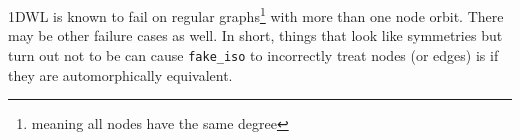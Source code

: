 \documentclass{article}
\begin{document}
1DWL is known to fail on regular graphs\footnote{meaning all nodes have the same degree} with more than one node orbit. There may be other failure cases as well. In short, things that look like symmetries but turn out not to be can cause \verb|fake_iso| to incorrectly treat nodes (or edges) is if they are automorphically equivalent.

% 
% 




\end{document}

